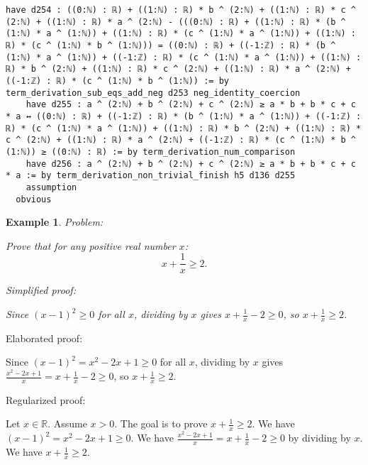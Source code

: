 \documentclass{article}
\newtheorem{example}{Example}
\begin{document}
\begin{tcolorbox}[colback=white!10, width=\linewidth]
\begin{lstlisting}[language=Lean4]
    have d254 : ((0:ℕ) : ℝ) + ((1:ℕ) : ℝ) * b ^ (2:ℕ) + ((1:ℕ) : ℝ) * c ^ (2:ℕ) + ((1:ℕ) : ℝ) * a ^ (2:ℕ) - (((0:ℕ) : ℝ) + ((1:ℕ) : ℝ) * (b ^ (1:ℕ) * a ^ (1:ℕ)) + ((1:ℕ) : ℝ) * (c ^ (1:ℕ) * a ^ (1:ℕ)) + ((1:ℕ) : ℝ) * (c ^ (1:ℕ) * b ^ (1:ℕ))) = ((0:ℕ) : ℝ) + ((-1:ℤ) : ℝ) * (b ^ (1:ℕ) * a ^ (1:ℕ)) + ((-1:ℤ) : ℝ) * (c ^ (1:ℕ) * a ^ (1:ℕ)) + ((1:ℕ) : ℝ) * b ^ (2:ℕ) + ((1:ℕ) : ℝ) * c ^ (2:ℕ) + ((1:ℕ) : ℝ) * a ^ (2:ℕ) + ((-1:ℤ) : ℝ) * (c ^ (1:ℕ) * b ^ (1:ℕ)) := by term_derivation_sub_eqs_add_neg d253 neg_identity_coercion
    have d255 : a ^ (2:ℕ) + b ^ (2:ℕ) + c ^ (2:ℕ) ≥ a * b + b * c + c * a ↔ ((0:ℕ) : ℝ) + ((-1:ℤ) : ℝ) * (b ^ (1:ℕ) * a ^ (1:ℕ)) + ((-1:ℤ) : ℝ) * (c ^ (1:ℕ) * a ^ (1:ℕ)) + ((1:ℕ) : ℝ) * b ^ (2:ℕ) + ((1:ℕ) : ℝ) * c ^ (2:ℕ) + ((1:ℕ) : ℝ) * a ^ (2:ℕ) + ((-1:ℤ) : ℝ) * (c ^ (1:ℕ) * b ^ (1:ℕ)) ≥ ((0:ℕ) : ℝ) := by term_derivation_num_comparison
    have d256 : a ^ (2:ℕ) + b ^ (2:ℕ) + c ^ (2:ℕ) ≥ a * b + b * c + c * a := by term_derivation_non_trivial_finish h5 d136 d255
    assumption
  obvious

\end{lstlisting}
\end{tcolorbox}


\begin{example}
Problem:
\begin{tcolorbox}[colback=yellow!10, width=\linewidth]
Prove that for any positive real number $x$:
    $$x + \frac{1}{x} \geq 2.$$
\end{tcolorbox}

Simplified proof:
\begin{tcolorbox}[colback=blue!10, width=\linewidth]
Since $(x-1)^2 \ge 0$ for all $x$, dividing by $x$ gives $x + \frac{1}{x} - 2 \ge 0$, so $x + \frac{1}{x} \ge 2$.
\end{tcolorbox}
\end{example}

Elaborated proof:
\begin{tcolorbox}[colback=green!10, width=\linewidth]
Since $(x-1)^2 = x^2 - 2x + 1 \ge 0$ for all $x$, dividing by $x$ gives $\frac{x^2 - 2x + 1}{x} = x + \frac{1}{x} - 2 \ge 0$, so $x + \frac{1}{x} \ge 2$.
\end{tcolorbox}

Regularized proof:
\begin{tcolorbox}[colback=red!10, width=\linewidth]
Let $x\in\mathbb{R}$. Assume $x>0$.
The goal is to prove $x + \frac{1}{x} \ge 2$.
We have ${\left(x-1\right)}^2 = x^2 - 2x + 1 \ge 0$.
We have $\frac{x^2 - 2x + 1}{x} = x + \frac{1}{x} - 2 \ge 0$ by dividing by $x$.
We have $x + \frac{1}{x} \ge 2$.
\end{tcolorbox}
\end{document}
